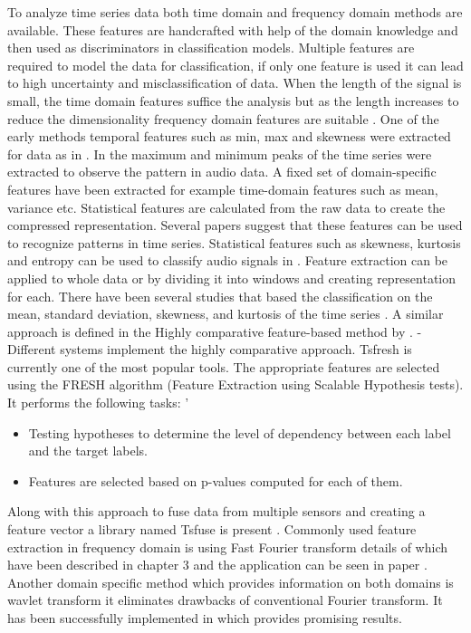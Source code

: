     To analyze time series data both time domain and frequency domain methods are available. These features are handcrafted with help of the domain knowledge and then used as discriminators in classification models. Multiple features are required to model the data for classification, if only one feature is used it can lead to high uncertainty and misclassification of data. When the length of the signal is small, the time domain features suffice the analysis but as the length increases to reduce the dimensionality frequency domain features are suitable \cite{shumway2000time}. One of the early methods temporal features such as min, max and skewness were extracted for data as in \cite{nanopoulos2001feature}. In \cite{geurts2001pattern} the maximum and minimum peaks of the time series were extracted to observe the pattern in audio data. A fixed set of domain-specific features have been extracted for example time-domain features such as mean, variance etc. Statistical features are calculated from the raw data to create the compressed representation. Several papers suggest that these features can be used to recognize patterns in time series. Statistical features such as skewness, kurtosis and entropy can be used to classify audio signals in \cite{lambrou1998classification}.
    Feature extraction can be applied to whole data or by dividing it into windows and creating representation for each. There have been several studies that based the classification
    on the mean, standard deviation, skewness, and kurtosis of the time series \cite{nanopoulos2001feature}. A similar approach is defined in the Highly comparative feature-based method by \cite{fulcher2014highly}. -Different systems implement the highly comparative approach. Tsfresh \cite{christ2018time} is currently one of the most popular tools. The appropriate features are selected using the FRESH algorithm (Feature Extraction using Scalable Hypothesis tests). It performs the following tasks: '
    \begin{itemize}
    	\item Testing hypotheses to determine the level of dependency between each label and the target labels.
    	\item Features are selected based on p-values computed for each of them.
    	\end{itemize}
  Along with this approach to fuse data from multiple sensors and creating a feature vector a library named Tsfuse is present \cite{de2019automating}. Commonly used feature extraction in frequency domain is using Fast Fourier transform details of which have been described in chapter 3 and the application can be seen in paper \cite{gowid2015novel}. Another domain specific method which provides information on both domains is wavlet transform it eliminates drawbacks of conventional Fourier transform. It has been successfully implemented in \cite{joo2015time}  which provides promising results. 
  

